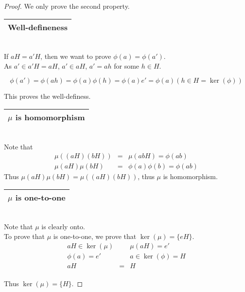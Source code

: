 \documentclass{article}
\theoremstyle{MyNonumberplain}
\theoremstyle{break}
\newtheorem*{proof}{Proof. }
\newcommand{\p}{\phi}
\theoremstyle{break}
\theoremstyle{break}
\theoremstyle{definition}
\theoremstyle{break}
\begin{document}
\begin{thmbox}
    \begin{prfbox}
        \begin{proof}
            We only prove the second property.\\

            \begin{tabular}{|c|}
            \hline
            Well-defineness\\
            \hline
            \end{tabular}\\

            If $a H = a' H$, then we want to prove $\p (a) = \p (a')$.\\

            As $a' \in a' H = a H$, $a' \in a H$, $a' = a h$ for some $h \in H$.

            $$\p (a') = \p (a h) = \p (a) \p (h) = \p (a) e' = \p (a) \left( h \in H =
            \ker \left( \p \right) \right)$$

            This proves the well-definess.\\

            \begin{tabular}{|c|}
            \hline
            $\mu$ is homomorphism\\
            \hline
            \end{tabular}\\

            Note that
            \begin{eqnarray*}
            \mu ( (a H) (b H)) & = & \mu (a b H) = \p (a b)\\
            \mu (a H) \mu (b H) & = & \p (a) \p (b) = \p (a b)
            \end{eqnarray*}
            Thus $\mu (a H) \mu (b H) = \mu ( (a H) (b H))$, thus $\mu$ is homomorphism.\\

            \begin{tabular}{|c|}
            \hline
            $\mu$ is one-to-one\\
            \hline
            \end{tabular}\\

            Note that $\mu$ is clearly onto.\\

            To prove that $\mu$ is one-to-one, we prove that $\ker (\mu) = \{ e H \}$.\\
            \begin{eqnarray*}
            a H \in \ker (\mu) &  & \mu (a H) = e'\\
            \p (a) = e' &  & a \in \ker \left( \p \right) = H\\
            a H & = & H
            \end{eqnarray*}\\
            Thus $\ker (\mu) = \{ H \}$.
        \end{proof}
    \end{prfbox}
\end{thmbox}
\end{document}
